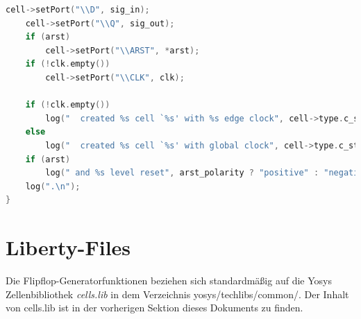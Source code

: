 \documentclass[11pt]{report}
\begin{document}
\begin{enumerate}
\begin{lstlisting}[language=C++]
	cell->setPort("\\D", sig_in);
	cell->setPort("\\Q", sig_out);
	if (arst)
		cell->setPort("\\ARST", *arst);
	if (!clk.empty())
		cell->setPort("\\CLK", clk);

	if (!clk.empty())
		log("  created %s cell `%s' with %s edge clock", cell->type.c_str(), cell->name.c_str(), clk_polarity ? "positive" : "negative");
	else
		log("  created %s cell `%s' with global clock", cell->type.c_str(), cell->name.c_str());
	if (arst)
		log(" and %s level reset", arst_polarity ? "positive" : "negative");
	log(".\n");
}
\end{lstlisting}

\end{enumerate}
\section{Liberty-Files}
Die Flipflop-Generatorfunktionen beziehen sich standardmäßig auf die Yosys Zellenbibliothek \textit{cells.lib} in dem Verzeichnis yosys/techlibs/common/. Der Inhalt von cells.lib ist in der vorherigen Sektion dieses Dokuments zu finden.
\printbibliography
\end{document}
